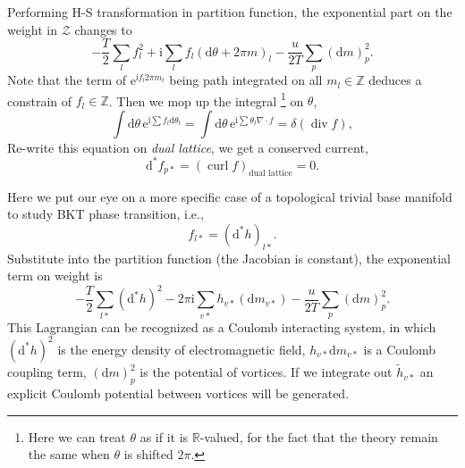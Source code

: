 Performing H-S transformation in partition function, the exponential part on the weight in $\mathcal{Z}$ changes to
\begin{equation}
  -\frac{T}{2} \sum_{l} f_l^{2} + \mathrm{i} \sum_{l} f_l \left( \mathrm{d} \theta + 2\pi  m \right)_{l} - \frac{u}{2T} \sum_{p} \left( \mathrm{d} m \right)_{p}^{2}.
\end{equation}
Note that the term of $\mathrm{e}^{\mathrm{i} f_l 2\pi m_l}$ being path integrated on all $m_l \in \mathbb{Z}$ deduces a constrain of $f_l \in \mathbb{Z}$. Then we mop up the integral \footnote{Here we can treat $\theta$ as if it is $\mathbb{R}$-valued, for the fact that the theory remain the same when $\theta$ is shifted $2\pi $.} on $\theta$,
\begin{equation}
  \int \mathrm{d} \theta \, \mathrm{e}^{ \mathrm{i}\sum f_l \mathrm{d} \theta_{l}} = \int \mathrm{d} \theta \, \mathrm{e}^{\mathrm{i} \sum \theta_{l} \nabla \cdot f} = \delta\left( \operatorname{div} f \right),
\end{equation}
Re-write this equation on \emph{dual lattice}, we get a conserved current,
\begin{equation}
  \mathrm{d} ^* f_{p*} = \left( \operatorname{curl} f \right)_{\text{dual lattice}} = 0.
\end{equation}

Here we put our eye on a more specific case of a topological trivial base manifold to study BKT phase transition, i.e.,
\begin{equation}
  f_{l*} = \left( \mathrm{d} ^{*} h \right)_{l*}.
\end{equation}
Substitute into the partition function (the Jacobian is constant), the exponential term on weight is
\begin{equation}
  - \frac{T}{2} \sum_{l*} \left( \mathrm{d} ^{*} h\right)^{2} - 2\pi  \mathrm{i} \sum_{v*} h_{v*} \left( \mathrm{d} m_{v*} \right) - \frac{u}{2T} \sum_{p} \left( \mathrm{d} m \right)_{p}^{2}.
\end{equation}
This Lagrangian can be recognized as a Coulomb interacting system, in which $\left( \mathrm{d} ^{*} h \right)^{2}$ is the energy density of electromagnetic field, $h_{v*} \mathrm{d} m_{v*}$ is a Coulomb coupling term, $\left( \mathrm{d} m \right)_{p}^{2}$ is the potential of vortices.
If we integrate out $\tilde{h}_{v*}$ an explicit Coulomb potential between vortices will be generated.
